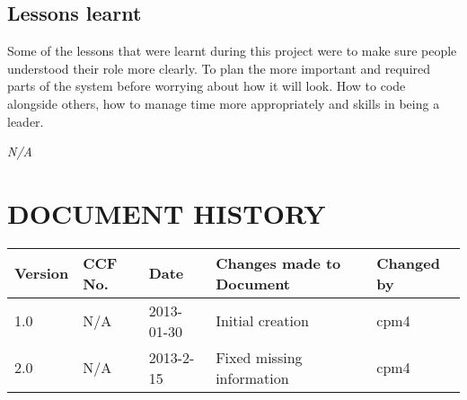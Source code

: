 \documentclass{project}
\begin{document}
\subsection{Lessons learnt}
Some of the lessons that were learnt during this project were to make sure people understood their role more clearly. To plan the more important and required parts of the system before worrying about how it will look. How to code alongside others, how to manage time more appropriately and skills in being a leader.

\clearpage
{}
\begin{thebibliography}{5}
\bibitem{} \emph{N/A}
\end{thebibliography}
\clearpage
{}
\section*{DOCUMENT HISTORY}
\begin{tabular}{|l | l | l | l | l |}
\hline
Version & CCF No. & Date & Changes made to Document & Changed by \\
\hline
1.0 & N/A & 2013-01-30 & Initial creation & cpm4 \\
\hline
2.0 & N/A & 2013-2-15 & Fixed missing information & cpm4 \\
\hline
\end{tabular}
\label{thelastpage}
\end{document}
